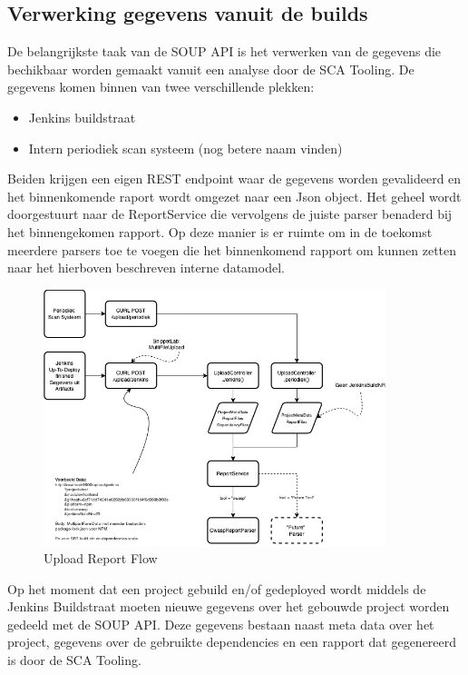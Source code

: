 \subsection{Verwerking gegevens vanuit de builds}\label{subsec:verwerking-gegevens-vanuit-de-sca}
De belangrijkste taak van de SOUP API is het verwerken van de gegevens die bechikbaar worden gemaakt vanuit een analyse door de SCA Tooling. De gegevens komen binnen van twee verschillende plekken:
\begin{itemize}
  \item Jenkins buildstraat
  \item Intern periodiek scan systeem (nog betere naam vinden)
\end{itemize}
Beiden krijgen een eigen REST endpoint waar de gegevens worden gevalideerd en het binnenkomende raport wordt omgezet naar een Json object. Het geheel wordt doorgestuurt naar de ReportService die vervolgens de juiste parser benaderd bij het binnengekomen rapport. Op deze manier is er ruimte om in de toekomst meerdere parsers toe te voegen die het binnenkomend rapport om kunnen zetten naar het hierboven beschreven interne datamodel.
\begin{figure}[bth]
  \myfloatalign
  \includegraphics[width=10cm]{gfx/SOUPAPI-UploadAnalysis}
  \caption{Upload Report Flow}
  \label{fig:UploadReportFlow}
\end{figure}



Op het moment dat een project gebuild en/of gedeployed wordt middels de Jenkins Buildstraat moeten nieuwe gegevens over het gebouwde project worden gedeeld met de SOUP API. Deze gegevens bestaan naast meta data over het project, gegevens over de gebruikte dependencies en een rapport dat gegenereerd is door de SCA Tooling.


